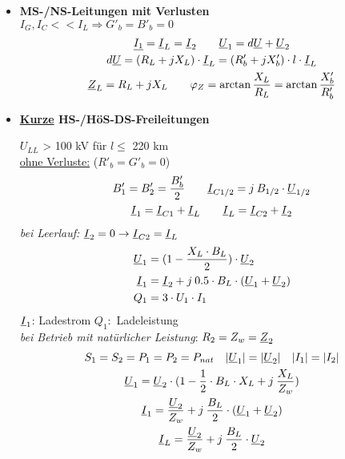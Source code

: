 \begin{itemize}
\newpage
\item[] \textbf{MS-/NS-Leitungen mit Verlusten}\\
    $I_G, I_C<< I_L \Rightarrow G'_b = B'_b = 0$
        \begin{gather*}
            \underline{I_1} = \underline{I}_L = \underline{I}_2 \qquad
            \underline{U}_1 = d \underline{U} + \underline{U}_2\\
            d \underline{U} = (R_L + jX_L) \cdot \underline{I}_L = (R'_b +jX'_b) \cdot l \cdot \underline{I}_L\\
            \underline{Z}_L = R_L +jX_L \qquad \varphi_Z =\arctan \frac{X_L}{R_L} = \arctan \frac{X'_b}{R'_b}
        \end{gather*}

\item[] \textbf{\ul{Kurze} HS-/HöS-DS-Freileitungen}

    $U_{LL}$ > 100 kV für $l\leq$ 220 km\\

    \ul{ohne Verluste:} ($R'_b = G'_b = 0$)
    \begin{gather*}
        B'_1 = B'_2 = \frac{B'_b}{2} \qquad
        \underline{I}_{C1/2} = j \: B_{1/2} \cdot \underline{U}_{1/2}\\
        \underline{I}_1 = \underline{I}_{C1} + \underline{I}_L \qquad  \underline{I}_L =  \underline{I}_{C2} +  \underline{I}_2
    \end{gather*}
    \textit{bei Leerlauf:} $\underline{I}_2 = 0 \rightarrow \underline{I}_{C2} = \underline{I}_L$
    \begin{align*}
        \underline{U}_1 &= (1 - \frac{X_L\cdot B_L}{2}) \cdot \underline{U}_2\\
        \underline{I}_1 &=  \underline{I}_2 + j \: 0.5 \cdot B_L \cdot ( \underline{U}_1 + \underline{U}_2)\\
        Q_1 &= 3\cdot U_1 \cdot I_1
    \end{align*}
    $\underline{I}_1$: Ladestrom \qquad
    $Q_1:$ Ladeleistung\\

    \textit{bei Betrieb mit natürlicher Leistung}: $R_2 = Z_w = \underline{Z}_2$
        \begin{gather*}
            S_1 = S_2 = P_1 = P_2 = P_{nat} \quad
            |\underline{U}_1| = |\underline{U}_2| \quad |I_1| = |I_2|\\
            \underline{U}_1 = \underline{U}_2 \cdot(1-\frac{1}{2} \cdot B_L \cdot X_L + j\: \frac{X_L}{Z_w})\\
            \underline{I}_1=  \frac{\underline{U}_2}{Z_w}+j\: \frac{B_L}{2}\cdot (\underline{U}_1 + \underline{U}_2)\\
            \underline{I}_L=  \frac{\underline{U}_2}{Z_w}+j\: \frac{B_L}{2}\cdot \underline{U}_2\\
        \end{gather*}


\end{itemize}
